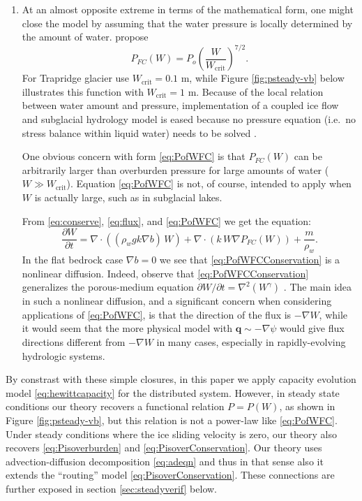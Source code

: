 \documentclass[11pt,final]{amsart}
\newcommand\bq{\mathbf{q}}
\newcommand{\Div}{\nabla\cdot}
\newcommand{\grad}{\nabla}
\begin{document}
\begin{enumerate}
\medskip

\item At an almost opposite extreme in terms of the mathematical form, one might close the model by assuming that the water pressure is locally determined by the amount of water.  \cite{FlowersClarke2002_theory} propose
\begin{equation}
P_{FC}(W) = P_o \left(\frac{W}{W_{\text{crit}}}\right)^{7/2}. \label{eq:PofWFC}
\end{equation}
For Trapridge glacier \cite{FlowersClarke2002_trapridge} use $W_{\text{crit}}=0.1$ m, while Figure \ref{fig:psteady-vb} below illustrates this function with $W_{\text{crit}}=1$ m.  Because of the local relation between water amount and pressure, implementation of a coupled ice flow and subglacial hydrology model is eased because no pressure equation (i.e.~no stress balance within liquid water) needs to be solved \citep{PimentelFlowersSchoof2010,PimentelFlowers2011}.

One obvious concern with form \eqref{eq:PofWFC} is that $P_{FC}(W)$ can be arbitrarily larger than overburden pressure for large amounts of water ($W \gg W_{\text{crit}}$).  Equation \eqref{eq:PofWFC} is not, of course, intended to apply when $W$ is actually large, such as in subglacial lakes.

From \eqref{eq:conserve}, \eqref{eq:flux}, and \eqref{eq:PofWFC} we get the equation:
\begin{equation}
  \frac{\partial W}{\partial t} = \Div\left((\rho_w g k \grad b)\, W\right) + \Div \left(k\,W \grad P_{FC}(W)\right) + \frac{m}{\rho_w}. \label{eq:PofWFCConservation}
\end{equation}
In the flat bedrock case $\grad b=0$ we see that \eqref{eq:PofWFCConservation} is a nonlinear diffusion.  Indeed, \cite{Schoofetal2012} observe that \eqref{eq:PofWFCConservation} generalizes the porous-medium equation $\partial W/\partial t = \grad^2 (W^\gamma)$ \citep{VazquezPME}.  The main idea in such a nonlinear diffusion, and a significant concern when considering applications of \eqref{eq:PofWFC}, is that the direction of the flux is $-\grad W$, while it would seem that the more physical model with $\bq \sim -\grad \psi$ would give flux directions different from $-\grad W$ in many cases, especially in rapidly-evolving hydrologic systems.
\end{enumerate}

\medskip
By constrast with these simple closures, in this paper we apply capacity evolution model \eqref{eq:hewittcapacity} for the distributed system.  However, in steady state conditions our theory recovers a functional relation $P=P(W)$, as shown in Figure \ref{fig:psteady-vb}, but this relation is not a power-law like \eqref{eq:PofWFC}.  Under steady conditions where the ice sliding velocity is zero, our theory also recovers \eqref{eq:Pisoverburden} and \eqref{eq:PisoverConservation}.  Our theory uses advection-diffusion decomposition \eqref{eq:adeqn} and thus in that sense also it extends the ``routing'' model \eqref{eq:PisoverConservation}.  These connections are further exposed in section \ref{sec:steadyverif} below.
\end{document}
